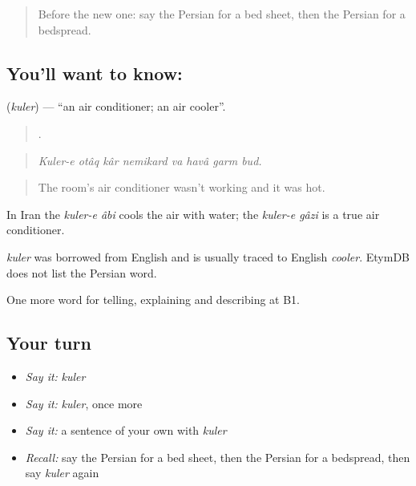 \label{lesson:FA-C439-kuler}



\begin{quote}
Before the new one: say the Persian for a bed sheet, then the Persian for a bedspread.
\end{quote}

\subsection*{You'll want to know: }
\textbf{} (\emph{kuler}) — \textquotedblleft{}an air conditioner; an air cooler\textquotedblright{}.

\begin{quote}
       .
\end{quote}

\begin{quote}
\emph{Kuler-e otâq kâr nemikard va havâ garm bud.}
\end{quote}

\begin{quote}
The room's air conditioner wasn't working and it was hot.
\end{quote}

In Iran the \emph{kuler-e âbi} cools the air with water; the \emph{kuler-e gâzi} is a true air conditioner.

\begin{cousinweb}
\emph{kuler} was borrowed from English and is usually traced to English \emph{cooler}. EtymDB does not list the Persian word.
\end{cousinweb}

\begin{grammarlens}[title={What you've built}]
One more word for telling, explaining and describing at B1.
\end{grammarlens}

\subsection*{Your turn}
\begin{itemize}
\raggedright
  \item \emph{Say it:} \emph{kuler}
  \item \emph{Say it:} \emph{kuler}, once more
  \item \emph{Say it:} a sentence of your own with \emph{kuler}
  \item \emph{Recall:} say the Persian for a bed sheet, then the Persian for a bedspread, then say \emph{kuler} again
\end{itemize}

